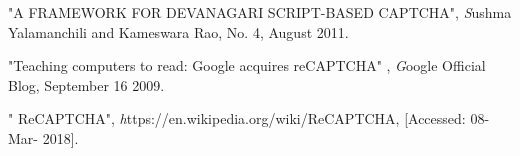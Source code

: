 \documentclass{article}
\begin{document}
\cleardoublepage

\begin{thebibliography}{9}


  "A FRAMEWORK FOR DEVANAGARI SCRIPT-BASED CAPTCHA",
  \textit
  Sushma Yalamanchili and Kameswara Rao,
  No. 4,
  August 2011.

"Teaching computers to read: Google acquires reCAPTCHA" ,
  \textit
  Google Official Blog,
  September 16 2009.


 " ReCAPTCHA",
  \textit
 https://en.wikipedia.org/wiki/ReCAPTCHA,
  [Accessed: 08- Mar- 2018].



\end{thebibliography}




\end{document}
